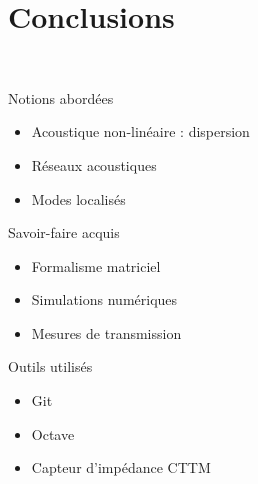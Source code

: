 \documentclass[12pt,notes=show]{beamer} %
\begin{document}
\section{Conclusions}
\begin{frame}{~}
\insertsectionhead
	\begin{block}{Notions abordées}
		\centering
		\begin{itemize}
			\item Acoustique non-linéaire : dispersion
			\item Réseaux acoustiques
			\item Modes localisés
		\end{itemize}
	\end{block}
	
	\begin{exampleblock}{Savoir-faire acquis}
		\begin{itemize}
			\item Formalisme matriciel
			\item Simulations numériques
			\item Mesures de transmission
		\end{itemize}
	\end{exampleblock}
	
	\begin{alertblock}{Outils utilisés}
		\begin{itemize}
			\item Git
			\item Octave
			\item Capteur d'impédance CTTM
		\end{itemize}
	\end{alertblock}
	
\end{frame}
\end{document}

